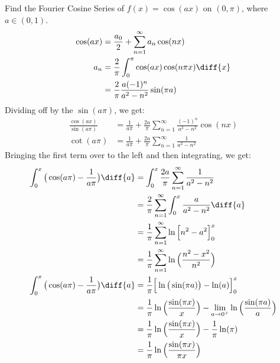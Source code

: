 \documentclass[crop=false,class=book,oneside]{standalone}
\begin{document}
            Find the Fourier Cosine Series of $f(x)=\cos(ax)$ on
            $(0,\pi)$, where $a\in(0,1)$.
            \begin{align}
                \cos(ax)&=\frac{a_{0}}{2}+
                    \sum_{n=1}^{\infty}a_{n}\cos(nx)\\
                a_{n}&=\frac{2}{\pi}
                    \int_{0}^{\pi}\cos(ax)\cos(n\pi{x})\diff{x}\\
                    &=\frac{2}{\pi}
                        \frac{a(-1)^{n}}{a^{2}-n^{2}}\sin(\pi{a})
            \end{align}
            Dividing off by the $\sin(a\pi)$, we get:
            \begin{align}
                \frac{\cos(ax)}{\sin(a\pi)}
                &=\frac{1}{a\pi}+\frac{2a}{\pi}
                    \sum_{n=1}^{\infty}\frac{(-1)^{n}}{a^{2}-n^{2}}
                    \cos(nx)\\
                \cot(a\pi)&=
                    \frac{1}{a\pi}+\frac{2a}{\pi}
                    \sum_{n=1}^{\infty}\frac{1}{a^{2}-n^{2}}
            \end{align}
            Bringing the first term over to the left and then integrating,
            we get:
            \begin{align}
                \int_{0}^{x}\big(\cos(a\pi)-\frac{1}{a\pi}\big)\diff{a}
                &=\int_{0}^{x}\frac{2a}{\pi}\sum_{n=1}^{\infty}
                    \frac{1}{a^{2}-n^{2}}\\
                &=\frac{2}{\pi}\sum_{n=1}^{\infty}\int_{0}^{x}
                    \frac{a}{a^{2}-n^{2}}\diff{a}\\
                &=\frac{1}{\pi}\sum_{n=1}^{\infty}
                    \ln\Big[n^{2}-a^{2}\Big]_{0}^{x}\\
                &=\frac{1}{\pi}\sum_{n=1}^{\infty}
                    \ln\Big(\frac{n^{2}-x^{2}}{n^{2}}\Big)\\
                \int_{0}^{x}\big(\cos(a\pi)-\frac{1}{a\pi}\big)\diff{a}
                &=\frac{1}{\pi}\Big[
                    \ln\big(\sin(\pi{a})\big)-\ln(a)
                \Big]_{0}^{x}\\
                &=\frac{1}{\pi}\ln\Big(\frac{\sin(\pi{x})}{x}\Big)-
                    \underset{a\rightarrow{0}^{+}}{\lim}
                    \ln\Big(\frac{\sin(\pi{a})}{a}\Big)\\
                &=\frac{1}{\pi}\ln\Big(\frac{\sin(\pi{x})}{x}\Big)-
                    \frac{1}{\pi}\ln(\pi)\\
                &=\frac{1}{\pi}\ln\Big(\frac{\sin(\pi{x})}{\pi{x}}\Big)
            \end{align}
\end{document}
